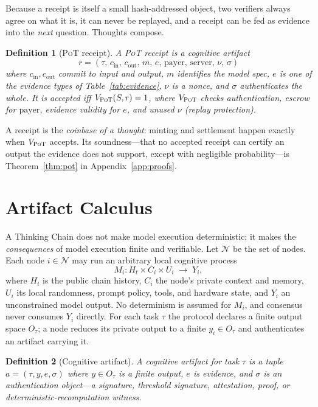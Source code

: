 \documentclass[11pt]{article}
\newtheorem{definition}{Definition}
\newcommand{\PoT}{\textsc{PoT}}
\newcommand{\N}{\mathcal{N}}
\begin{document}
Because a receipt is itself a small hash-addressed object, two verifiers always agree on what it is, it can never be replayed, and a receipt can be fed as evidence into the \emph{next} question. Thoughts compose.

\begin{definition}[\PoT{} receipt]
\label{def:pot}
A \PoT{} receipt is a cognitive artifact
\[ r=(\tau,\, c_{\mathrm{in}},\, c_{\mathrm{out}},\, m,\, e,\, \mathrm{payer},\, \mathrm{server},\, \nu,\, \sigma) \]
where $c_{\mathrm{in}},c_{\mathrm{out}}$ commit to input and output, $m$ identifies the model spec, $e$ is one of the evidence types of Table~\ref{tab:evidence}, $\nu$ is a nonce, and $\sigma$ authenticates the whole. It is accepted iff $V_{\PoT}(S,r)=1$, where $V_{\PoT}$ checks authentication, escrow for $\mathrm{payer}$, evidence validity for $e$, and unused $\nu$ (replay protection).
\end{definition}

\noindent A receipt is the \emph{coinbase of a thought}: minting and settlement happen exactly when $V_{\PoT}$ accepts. Its soundness---that no accepted receipt can certify an output the evidence does not support, except with negligible probability---is Theorem~\ref{thm:pot} in Appendix~\ref{app:proofs}.

\section{Artifact Calculus}
\label{sec:calculus}

A Thinking Chain does not make model execution deterministic; it makes the \emph{consequences} of model execution finite and verifiable. Let $\N$ be the set of nodes. Each node $i\in\N$ may run an arbitrary local cognitive process
\[ M_i : H_t \times C_i \times U_i \;\rightarrow\; Y_i, \]
where $H_t$ is the public chain history, $C_i$ the node's private context and memory, $U_i$ its local randomness, prompt policy, tools, and hardware state, and $Y_i$ an unconstrained model output. No determinism is assumed for $M_i$, and consensus never consumes $Y_i$ directly. For each task $\tau$ the protocol declares a finite output space $O_\tau$; a node reduces its private output to a finite $y_i\in O_\tau$ and authenticates an artifact carrying it.

\begin{definition}[Cognitive artifact]
A cognitive artifact for task $\tau$ is a tuple $a=(\tau, y, e, \sigma)$ where $y\in O_\tau$ is a finite output, $e$ is evidence, and $\sigma$ is an authentication object---a signature, threshold signature, attestation, proof, or deterministic-recomputation witness.
\end{definition}
\end{document}
